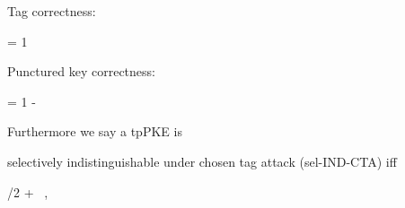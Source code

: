 \begin{definition}
\begin{sitemize}
        \item Tag correctness:
        \begin{bralign}
            = 1
        \end{bralign}

        \item Punctured key correctness:
        \begin{bralign}
            = 1 - \negl\parr{\secpar}
        \end{bralign}
    \end{sitemize}
    Furthermore we say a tpPKE is
    \begin{sitemize}
        \item selectively indistinguishable under chosen tag attack (sel-IND-CTA) iff
        \begin{bralign}
            /2 + \negl\parr{\secpar}
            \ ,
        \end{bralign}


\end{sitemize}
\end{definition}
